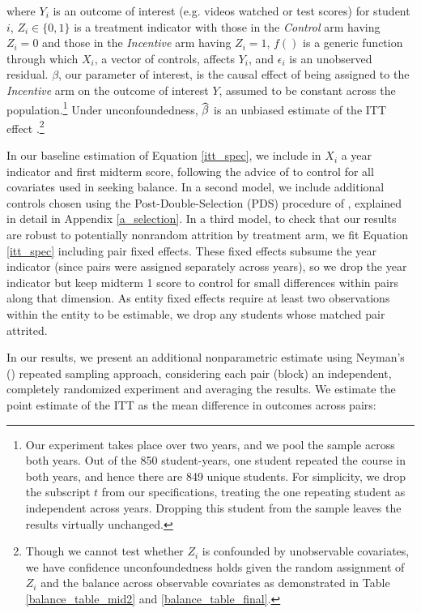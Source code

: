 \documentclass[12pt]{article}
\newcommand\wh[1]{\hstretch{2}{\hat{\hstretch{.5}{#1}}}}
\begin{document}
where $Y_i$ is an outcome of interest (e.g. videos watched or test scores) for student $i$, $Z_i \in \{0,1\}$ is a treatment indicator with those in the \textit{Control} arm having $Z_i=0$ and those in the \textit{Incentive} arm having $Z_i=1$, $f()$ is a generic function through which $X_i$, a vector of controls, affects $Y_i$, and $\epsilon_i$ is an unobserved residual. $\beta$, our parameter of interest, is the causal effect of being assigned to the \textit{Incentive} arm on the outcome of interest $Y$, assumed to be constant across the population.\footnote{Our experiment takes place over two years, and we pool the sample across both years. Out of the 850 student-years, one student repeated the course in both years, and hence there are 849 unique students. For simplicity, we drop the subscript $t$ from our specifications, treating the one repeating student as independent across years. Dropping this student from the sample leaves the results virtually unchanged.} Under unconfoundedness, $\wh{\beta}$ is an unbiased estimate of the ITT effect \parencite{ir2015}.\footnote{Though we cannot test whether $Z_i$ is confounded by unobservable covariates, we have confidence unconfoundedness holds given the random assignment of $Z_i$ and the balance across observable covariates as demonstrated in Table \ref{balance_table_mid2} and \ref{balance_table_final}.}

In our baseline estimation of Equation \ref{itt_spec}, we include in $X_i$ a year indicator and first midterm score, following the advice of \textcite{bm2009} to control for all covariates used in seeking balance. In a second model, we include additional controls chosen using the Post-Double-Selection (PDS) procedure of \textcite{bch2014a}, explained in detail in Appendix \ref{a_selection}. In a third model, to check that our results are robust to potentially nonrandom attrition by treatment arm, we fit Equation \ref{itt_spec} including pair fixed effects. These fixed effects subsume the year indicator (since pairs were assigned separately across years), so we drop the year indicator but keep midterm 1 score to control for small differences within pairs along that dimension. As entity fixed effects require at least two observations within the entity to be estimable, we drop any students whose matched pair attrited.

In our results, we present an additional nonparametric estimate using Neyman's (\citeyear{neyman1923}) repeated sampling approach, considering each pair (block) an independent, completely randomized experiment and averaging the results. We estimate the point estimate of the ITT as the mean difference in outcomes across pairs:
\end{document}
